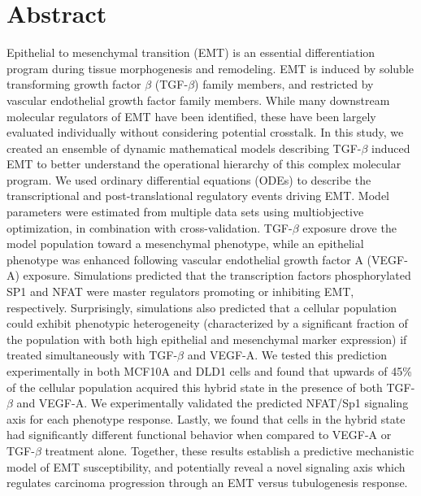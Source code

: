 \documentclass[11pt,letterpaper]{article}
\begin{document}
\section*{Abstract}
Epithelial to mesenchymal transition (EMT) is an essential differentiation program during tissue morphogenesis and remodeling.
EMT is induced by soluble transforming growth factor $\beta$ (TGF-$\beta$) family members, and restricted by vascular endothelial growth factor family members.
While many downstream molecular regulators of EMT have been identified, these have been largely evaluated individually without considering potential crosstalk.
In this study, we created an ensemble of dynamic mathematical models describing TGF-$\beta$ induced EMT to better understand the operational hierarchy of this complex molecular program.
We used ordinary differential equations (ODEs) to describe the transcriptional and post-translational regulatory events driving EMT.
Model parameters were estimated from multiple data sets using multiobjective optimization, in combination with cross-validation.
TGF-$\beta$ exposure drove the model population toward a mesenchymal phenotype, while an epithelial phenotype was enhanced following vascular endothelial growth factor A (VEGF-A) exposure.
Simulations predicted that the transcription factors phosphorylated SP1 and NFAT were master regulators promoting or inhibiting EMT, respectively.
Surprisingly, simulations also predicted that a cellular population could exhibit phenotypic heterogeneity (characterized by a significant fraction of the population with both high epithelial and mesenchymal marker expression)
if treated simultaneously with TGF-$\beta$ and VEGF-A.  We tested this prediction experimentally in both MCF10A and DLD1 cells and found that upwards of 45\% of the cellular population acquired this hybrid state in the presence of both TGF-$\beta$ and VEGF-A.
We experimentally validated the predicted NFAT/Sp1 signaling axis for each phenotype response. Lastly, we found that cells in the hybrid state had significantly different functional behavior when compared to VEGF-A or TGF-$\beta$ treatment alone.
Together, these results establish a predictive mechanistic model of EMT susceptibility, and potentially reveal a novel signaling axis which regulates carcinoma progression through an EMT versus tubulogenesis response.
\end{document}
